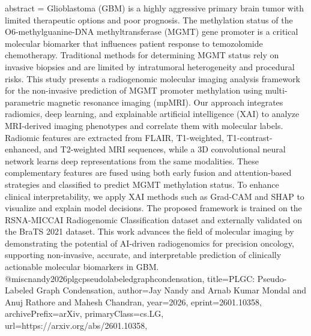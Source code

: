 {      abstract = {Glioblastoma (GBM) is a highly aggressive primary brain tumor with limited therapeutic options and poor prognosis. The methylation status of the O6-methylguanine-DNA methyltransferase (MGMT) gene promoter is a critical molecular biomarker that influences patient response to temozolomide chemotherapy. Traditional methods for determining MGMT status rely on invasive biopsies and are limited by intratumoral heterogeneity and procedural risks. This study presents a radiogenomic molecular imaging analysis framework for the non-invasive prediction of MGMT promoter methylation using multi-parametric magnetic resonance imaging (mpMRI).   Our approach integrates radiomics, deep learning, and explainable artificial intelligence (XAI) to analyze MRI-derived imaging phenotypes and correlate them with molecular labels. Radiomic features are extracted from FLAIR, T1-weighted, T1-contrast-enhanced, and T2-weighted MRI sequences, while a 3D convolutional neural network learns deep representations from the same modalities. These complementary features are fused using both early fusion and attention-based strategies and classified to predict MGMT methylation status.   To enhance clinical interpretability, we apply XAI methods such as Grad-CAM and SHAP to visualize and explain model decisions. The proposed framework is trained on the RSNA-MICCAI Radiogenomic Classification dataset and externally validated on the BraTS 2021 dataset. This work advances the field of molecular imaging by demonstrating the potential of AI-driven radiogenomics for precision oncology, supporting non-invasive, accurate, and interpretable prediction of clinically actionable molecular biomarkers in GBM.}
}@misc{nandy2026plgcpseudolabeledgraphcondensation,
      title={PLGC: Pseudo-Labeled Graph Condensation}, 
      author={Jay Nandy and Arnab Kumar Mondal and Anuj Rathore and Mahesh Chandran},
      year={2026},
      eprint={2601.10358},
      archivePrefix={arXiv},
      primaryClass={cs.LG},
      url={https://arxiv.org/abs/2601.10358},
}
